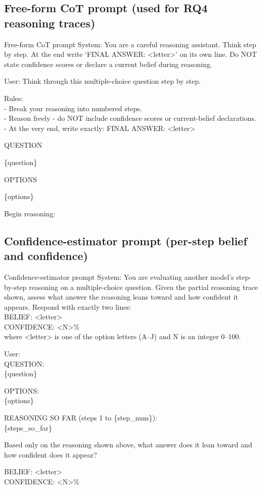 \subsection{Free-form CoT prompt (used for RQ4 reasoning traces)}

\begin{promptbox}{Free-form CoT prompt}
System: You are a careful reasoning assistant. Think step by step. At the end write `FINAL ANSWER: <letter>' on its own line. Do NOT state confidence scores or declare a current belief during reasoning.

\smallskip
User: Think through this multiple-choice question step by step.

\smallskip
Rules:\\
- Break your reasoning into numbered steps.\\
- Reason freely - do NOT include confidence scores or current-belief declarations.\\
- At the very end, write exactly: FINAL ANSWER: <letter>

\smallskip
QUESTION

\{question\}

\smallskip
OPTIONS

\{options\}

\smallskip
Begin reasoning:
\end{promptbox}

\subsection{Confidence-estimator prompt (per-step belief and confidence)}

\begin{promptbox}{Confidence-estimator prompt}
System: You are evaluating another model's step-by-step reasoning on a multiple-choice question. Given the partial reasoning trace shown, assess what answer the reasoning leans toward and how confident it appears. Respond with exactly two lines:\\
BELIEF: <letter>\\
CONFIDENCE: <N>\%\\
where <letter> is one of the option letters (A--J) and N is an integer 0--100.

\smallskip
User:\\
QUESTION:\\
\{question\}

\smallskip
OPTIONS:\\
\{options\}

\smallskip
REASONING SO FAR (steps 1 to \{step\_num\}):\\
\{steps\_so\_far\}

\smallskip
Based only on the reasoning shown above, what answer does it lean toward and how confident does it appear?

\smallskip
BELIEF: <letter>\\
CONFIDENCE: <N>\%
\end{promptbox}

